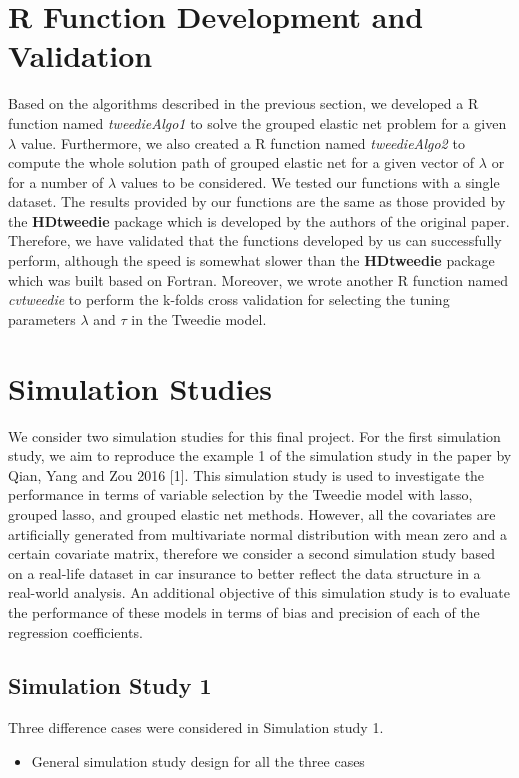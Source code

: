\documentclass[paper=a4, fontsize=11pt]{scrartcl} %
\begin{document}
\section*{\textbf{R Function Development and Validation}}
Based on the algorithms described in the previous section, we developed a R function named \textit{tweedieAlgo1} to solve the grouped elastic net problem for a given $\lambda$ value. Furthermore, we also created a R function named \textit{tweedieAlgo2} to compute the whole solution path of grouped elastic net for a given vector of $\lambda$ or for a number of $\lambda$ values to be considered. We tested our functions with a single dataset. The results provided by our functions are the same as those provided by the \textbf{HDtweedie} package which is developed by the authors of the original paper. Therefore, we have validated that the functions developed by us can successfully perform, although the speed is somewhat slower than the \textbf{HDtweedie} package which was built based on Fortran. Moreover, we wrote another R function named \textit{cvtweedie} to perform the k-folds cross validation for selecting the tuning parameters $\lambda$ and $\tau$ in the Tweedie model. 


\section*{\textbf{Simulation Studies}}
We consider two simulation studies for this final project. For the first simulation study, we aim to reproduce the example 1 of the simulation study in the paper by Qian, Yang and Zou 2016 [1]. This simulation study is used to investigate the performance in terms of variable selection by the Tweedie model with lasso, grouped lasso, and grouped elastic net methods. However, all the covariates are artificially generated from multivariate normal distribution with mean zero and a certain covariate matrix, therefore we consider a second simulation study based on a real-life dataset in car insurance to better reflect the data structure in a real-world analysis. An additional objective of this simulation study is to evaluate the performance of these models in terms of bias and precision of each of the regression coefficients.\\

\subsection*{\textbf{Simulation Study 1}}
Three difference cases were considered in Simulation study 1.
\begin{itemize}
\item General simulation study design for all the three cases\\
\end{itemize}
\end{document}

